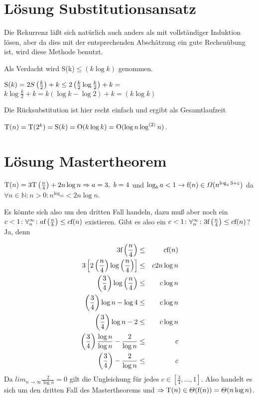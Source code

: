 \documentclass[ngerman,draft,parskip=half*,twoside]{scrreprt}
\theoremstyle{break}
\begin{document}
\section{Lösung Substitutionsansatz}
\label{lsg_substitutionsansatz}

Die Rekurrenz läßt sich natürlich auch anders als mit vollständiger Induktion lösen, aber da dies mit der entsprechenden Abschätzung ein
gute Rechenübung ist, wird diese Methode benutzt.

Als Verdacht wird S(k)$\leq(k \log k)$ genommen.

\noindent
\(\textup{S}(k) = 2 S\left(\frac{k}{2}\right)+k\leq 2 \left(\frac{k}{2} \log \frac{k}{2}\right)+k=\)
\(k \log \frac{k}{2}+k=k \left(\log k-\log 2\right)+k=(k \log k)\)

Die Rücksubstitution ist hier recht einfach und ergibt als Gesamtlaufzeit

$\textup{T}(n)=\textup{T}(2^k)=\textup{S}(k)=\textup{O}(k \log k)=\textup{O}(\log n \log^{(2)} n)$.

\section{Lösung Mastertheorem}
\label{mastertheorem_Fall3}

\( \textup{T}(n) = 3 \textup{T}\left(\frac{n}{4}\right) + 2n\log n \Rightarrow a=3,\ b=4\) und \(\log_ba<1 \rightarrow 
\textup{f}(n) \in \Omega(n^{\log_43+\varepsilon})\) da \(\forall n \in \mathbb{N}\colon  n>0\colon  n^{\log_43}<2n\log n\).

Es könnte sich also um den dritten Fall handeln, dazu muß aber noch ein \(c < 1 \colon  \forall^{\infty}_{n}\colon 
a \textup{f}\left(\frac{n}{b}\right)  \leq c \textup{f}(n)\) existieren. Gibt es also ein 
\(c<1\colon  \forall^{\infty}_{n}\colon  3\textup{f}\left(\frac{n}{4}\right) \leq c\textup{f}(n)\)? Ja, denn

\begin{align*}
3\textup{f}\left(\frac{n}{4}\right) & \leq & c \textup{f}(n)\\
3\left[2\left(\frac{n}{4}\right) \log \left(\frac{n}{4}\right)\right] & \leq & c 2n \log n\\
\left(\frac{3}{4}\right) \log \left(\frac{n}{4}\right) & \leq & c \log n\\
\left(\frac{3}{4}\right) \log n- \log 4 & \leq & c \log n\\
\left(\frac{3}{4}\right) \log n- 2 & \leq & c \log n\\
\left(\frac{3}{4}\right) \frac{\log n}{\log n}-\frac{2}{\log n} & \leq & c\\
\left(\frac{3}{4}\right) -\frac{2}{\log n} & \leq & c
\end{align*}
Da \(lim_{n \to \infty} \frac{2}{\log n}=0\) gilt die Ungleichung für jedes \(c \in [\frac{3}{4},\ldots,1]\). %
Also handelt es sich um den dritten Fall des Mastertheorems und 
\( \Rightarrow \textup{T}(n) \in \Theta (\textup{f}(n))=\Theta (n\log n)\).
\end{document}
